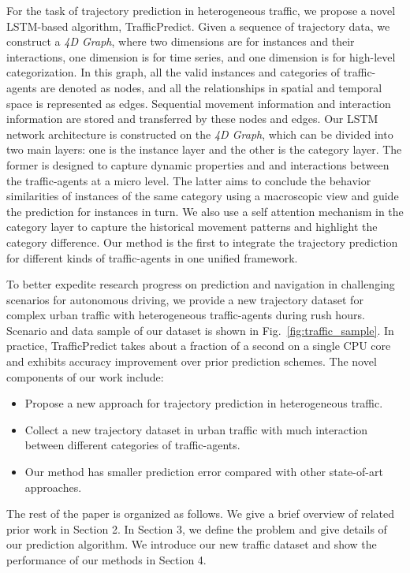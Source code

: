 \documentclass[letterpaper]{article} \usepackage{aaai19}  \usepackage{times}  \usepackage{helvet}  \usepackage{courier}  \usepackage{url}  \usepackage{graphicx}  \usepackage{amsmath}
\begin{document}
 For the task of trajectory prediction in heterogeneous traffic, we propose a novel LSTM-based algorithm, TrafficPredict. Given a sequence of trajectory data, we construct a \textit{4D Graph}, where two dimensions are for instances and their interactions, one dimension is for time series, and one dimension is for high-level categorization. In this graph, all the valid instances and categories of traffic-agents are denoted as nodes, and all the relationships in spatial and temporal space is represented as edges. Sequential movement information and interaction information are stored and transferred by these nodes and edges. Our LSTM network architecture is constructed on the \textit{4D Graph}, which can be divided into two main layers: one is the instance layer and the other is the category layer. The former is designed to capture dynamic properties and and interactions between the traffic-agents at a micro level. The latter aims to conclude the behavior similarities of instances of the same category using a macroscopic view and guide the prediction for instances in turn. We also use a self attention mechanism in the category layer to capture the historical movement patterns and highlight the category difference. Our method is the first to integrate the trajectory prediction for different kinds of traffic-agents in one unified framework. 

To better expedite research progress on prediction and navigation in challenging scenarios for autonomous driving, we provide a new trajectory dataset for complex urban traffic with heterogeneous traffic-agents during rush hours. Scenario and data sample of our dataset is shown in Fig.~\ref{fig:traffic_sample}. In practice, TrafficPredict takes about a fraction of a second on a single CPU core and exhibits  accuracy improvement over prior prediction schemes. The novel components of our work include:
\begin{itemize}
\item {Propose a new approach for trajectory prediction in heterogeneous traffic.}
\item {Collect a new trajectory dataset in urban traffic with much interaction between different categories of traffic-agents.}
\item {Our method has smaller prediction error compared with other state-of-art approaches.}
\end{itemize}


The rest of the paper is organized as follows. We give a brief overview of related prior work in Section 2. In Section 3, we define the problem and give details of our prediction algorithm. We introduce our new traffic dataset and show the performance of our methods in Section 4.
\end{document}
